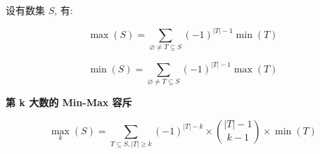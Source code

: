 设有数集 $S$, 有:

$$
\max(S)=\sum\limits_{\varnothing\ne T\subseteq S} (-1)^{|T|-1} \min(T)
$$

$$
\min(S)=\sum\limits_{\varnothing\ne T\subseteq S} (-1)^{|T|-1} \max(T)
$$

\textbf{第 k 大数的 Min-Max 容斥}

$$
\operatorname{max}_k(S)=\sum\limits_{T\subseteq S,|T|\ge k}(-1)^{|T|-k}\times\binom {|T|-1}{k-1}\times \min(T)
$$
